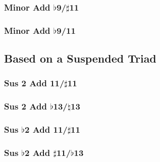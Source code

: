 \documentclass[english]{./gbook}
\begin{document}
\begin{large}
\subsubsection{Minor Add $\flat$9/$\sharp$11}

\subsubsection{Minor Add $\flat$9/11}


\subsection{Based on a Suspended Triad}

\subsubsection{Sus 2 Add 11/$\sharp$11}

\subsubsection{Sus 2 Add $\flat$13/$\natural$13}

\subsubsection{Sus $\flat$2 Add 11/$\sharp$11}

\subsubsection{Sus $\flat$2 Add $\sharp$11/$\flat$13}




\end{large}
\end{document}
